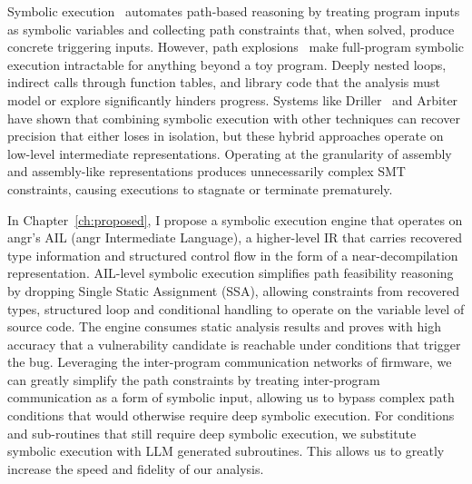 Symbolic execution~\cite{king1976symbolic} automates path-based reasoning by treating program inputs as symbolic variables and collecting path constraints that,
when solved, produce concrete triggering inputs.
However, path explosions~\cite{krishnamoorthy2010tackling} make full-program symbolic execution intractable for anything beyond a toy program.
Deeply nested loops, indirect calls through function tables, and library code that the analysis must model or explore significantly hinders progress.
Systems like Driller~\cite{stephens2016driller} and Arbiter~\cite{vadayath2022arbiter} have shown that combining symbolic execution with other
techniques can recover precision that either loses in isolation, but these hybrid approaches operate on low-level intermediate
representations.
Operating at the granularity of assembly and assembly-like representations produces unnecessarily complex SMT constraints, causing executions to stagnate or terminate prematurely.

In Chapter~\ref{ch:proposed}, I propose a symbolic execution engine that operates on angr's AIL (angr Intermediate Language), a higher-level IR that
carries recovered type information and structured control flow in the form of a near-decompilation representation.
AIL-level symbolic execution simplifies path feasibility reasoning by dropping Single Static Assignment (SSA), allowing
constraints from recovered types, structured loop and conditional handling to operate on the variable level of source code.
The engine consumes static analysis results and proves with high accuracy that a vulnerability candidate is reachable under conditions that trigger the bug.
Leveraging the inter-program communication networks of firmware, we can greatly simplify the path constraints by treating inter-program communication as a form of symbolic input,
allowing us to bypass complex path conditions that would otherwise require deep symbolic execution.
For conditions and sub-routines that still require deep symbolic execution, we substitute symbolic execution with LLM generated subroutines.
This allows us to greatly increase the speed and fidelity of our analysis.
